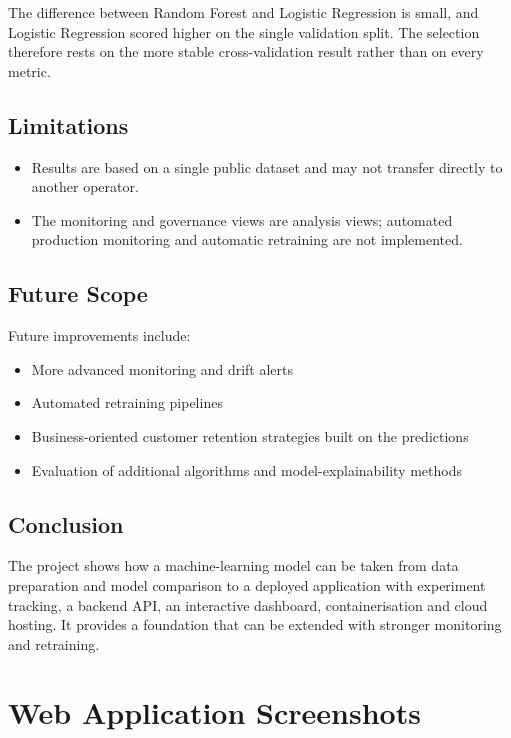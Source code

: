 \documentclass[12pt,a4paper]{report}
\begin{document}
The difference between Random Forest and Logistic Regression is small, and Logistic Regression scored higher on the single validation split. The selection therefore rests on the more stable cross-validation result rather than on every metric.

\section{Limitations}

\begin{itemize}
\item Results are based on a single public dataset and may not transfer directly to another operator.
\item The monitoring and governance views are analysis views; automated production monitoring and automatic retraining are not implemented.
\end{itemize}

\section{Future Scope}

Future improvements include:

\begin{itemize}
\item More advanced monitoring and drift alerts
\item Automated retraining pipelines
\item Business-oriented customer retention strategies built on the predictions
\item Evaluation of additional algorithms and model-explainability methods
\end{itemize}

\section{Conclusion}

The project shows how a machine-learning model can be taken from data preparation and model comparison to a deployed application with experiment tracking, a backend API, an interactive dashboard, containerisation and cloud hosting. It provides a foundation that can be extended with stronger monitoring and retraining.

\appendix
\chapter{Web Application Screenshots}
\label{appendix:web_interface}
\end{document}
